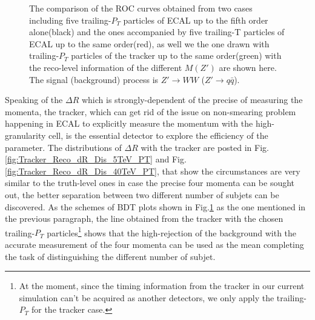 \begin{figure}
\begin{center}
\end{center}
\caption{The comparison of the ROC curves obtained from two cases including five trailing-$P_{T}$ particles of ECAL up to the fifth order alone(black) and the ones accompanied by five trailing-T particles of ECAL up to the same order(red), as well we the one drawn with trailing-$P_{T}$ particles of the tracker up to the same order(green) with the reco-level information of the different $M(Z')$ are shown here. The signal (background) process is $Z'\rightarrow WW$ ($Z' \rightarrow q\bar{q}$). \label{fig:Reco_dR_BDT}}
\end{figure}

Speaking of the $\Delta R$ which is strongly-dependent of the precise of measuring the momenta, the tracker, which can get rid of the issue on non-smearing problem happening in ECAL to explicitly measure the momentum with the high-granularity cell, is the essential detector to explore the efficiency of the parameter. The distributions of $\Delta R$ with the tracker are posted in Fig.\ref{fig:Tracker_Reco_dR_Dis_5TeV_PT} and Fig.\ref{fig:Tracker_Reco_dR_Dis_40TeV_PT}, that show the circumstances are very similar to the truth-level ones in case the precise four momenta can be sought out, the better separation between two different number of subjets can be discovered. As the schemes of BDT plots shown in Fig.\ref{fig:Reco_dR_BDT} as the one mentioned in the previous paragraph, the line obtained from the tracker with the chosen trailing-$P_{T}$ particles\footnote{At the moment, since the timing information from the tracker in our current simulation can't be acquired as another detectors, we only apply the trailing-$P_{T}$ for the tracker case.} shows that the high-rejection of the background with the accurate measurement of the four momenta can be used as the mean completing the task of distinguishing the different number of subjet. \\

